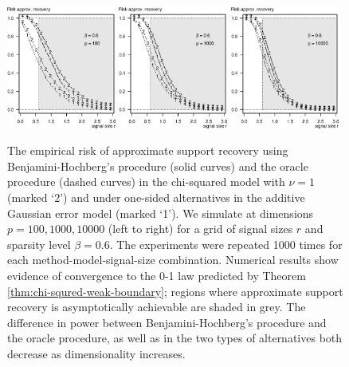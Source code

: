 \begin{figure}
      \centering
      \includegraphics[width=0.32\textwidth]{./sim_one-vs-two-sided/approx_recovery_one-vs-two-sided_beta06_p100.eps}
      \includegraphics[width=0.32\textwidth]{./sim_one-vs-two-sided/approx_recovery_one-vs-two-sided_beta06_p1000.eps}
      \includegraphics[width=0.32\textwidth]{./sim_one-vs-two-sided/approx_recovery_one-vs-two-sided_beta06_p10000.eps}
      \caption{The empirical risk of approximate support recovery using Benjamini-Hochberg's procedure (solid curves) and the oracle procedure (dashed curves) in the chi-squared model with $\nu=1$ (marked `2') and under one-sided alternatives in the additive Gaussian error model (marked `1'). 
      We simulate at dimensions $p=100, 1000, 10000$ (left to right) for a grid of signal sizes $r$ and sparsity level $\beta=0.6$.
      The experiments were repeated 1000 times for each method-model-signal-size combination. 
      Numerical results show evidence of convergence to the 0-1 law predicted by Theorem \ref{thm:chi-squred-weak-boundary}; regions where approximate support recovery is asymptotically achievable are shaded in grey.
      The difference in power between Benjamini-Hochberg's procedure and the oracle procedure, as well as in the two types of alternatives both decrease as dimensionality increases.} 
      \label{fig:one-vs-two-sided-approx_support_recovery}
\end{figure}


